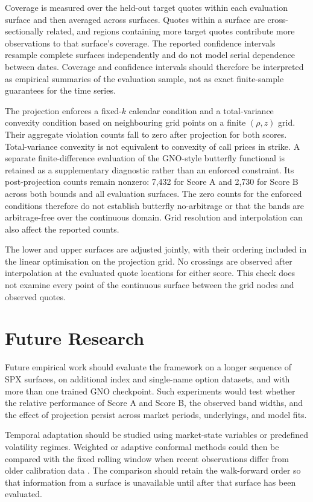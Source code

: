 Coverage is measured over the held-out target quotes within each evaluation surface and then averaged across surfaces. Quotes within a surface are cross-sectionally related, and regions containing more target quotes contribute more observations to that surface's coverage. The reported confidence intervals resample complete surfaces independently and do not model serial dependence between dates. Coverage and confidence intervals should therefore be interpreted as empirical summaries of the evaluation sample, not as exact finite-sample guarantees for the time series.

The projection enforces a fixed-$k$ calendar condition and a total-variance convexity condition based on neighbouring grid points on a finite $(\rho,z)$ grid. Their aggregate violation counts fall to zero after projection for both scores. Total-variance convexity is not equivalent to convexity of call prices in strike. A separate finite-difference evaluation of the GNO-style butterfly functional is retained as a supplementary diagnostic rather than an enforced constraint. Its post-projection counts remain nonzero: 7,432 for Score A and 2,730 for Score B across both bounds and all evaluation surfaces. The zero counts for the enforced conditions therefore do not establish butterfly no-arbitrage or that the bands are arbitrage-free over the continuous domain. Grid resolution and interpolation can also affect the reported counts.

The lower and upper surfaces are adjusted jointly, with their ordering included in the linear optimisation on the projection grid. No crossings are observed after interpolation at the evaluated quote locations for either score. This check does not examine every point of the continuous surface between the grid nodes and observed quotes.

\section{Future Research}
\label{sec:disc_future}

Future empirical work should evaluate the framework on a longer sequence of SPX surfaces, on additional index and single-name option datasets, and with more than one trained GNO checkpoint. Such experiments would test whether the relative performance of Score A and Score B, the observed band widths, and the effect of projection persist across market periods, underlyings, and model fits.

Temporal adaptation should be studied using market-state variables or predefined volatility regimes. Weighted or adaptive conformal methods could then be compared with the fixed rolling window when recent observations differ from older calibration data \cite{barber2023conformal}. The comparison should retain the walk-forward order so that information from a surface is unavailable until after that surface has been evaluated.

